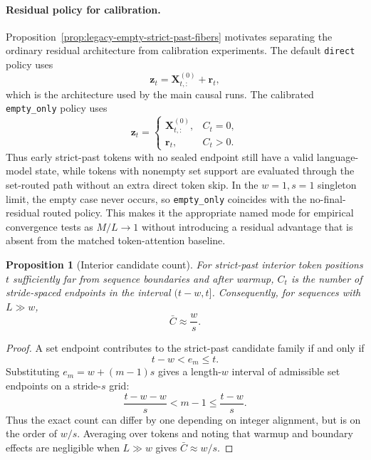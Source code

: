 \documentclass{article}
\theoremstyle{plain}
\newtheorem{proposition}[theorem]{Proposition}
\theoremstyle{definition}
\theoremstyle{remark}
\begin{document}
\paragraph{Residual policy for calibration.}
Proposition~\ref{prop:legacy-empty-strict-past-fibers} motivates separating the
ordinary residual architecture from calibration experiments. The default
\texttt{direct} policy uses
\[
\mathbf z_t=\mathbf X^{(0)}_{t,:}+\mathbf r_t,
\]
which is the architecture used by the main causal runs. The calibrated
\texttt{empty\_only} policy uses
\[
\mathbf z_t=
\begin{cases}
\mathbf X^{(0)}_{t,:},& C_t=0,\\
\mathbf r_t,& C_t>0.
\end{cases}
\]
Thus early strict-past tokens with no sealed endpoint still have a valid
language-model state, while tokens with nonempty set support are evaluated
through the set-routed path without an extra direct token skip. In the
$w=1,s=1$ singleton limit, the empty case never occurs, so
\texttt{empty\_only} coincides with the no-final-residual routed policy.
This makes it the appropriate named mode for empirical convergence tests as
$M/L\to1$ without introducing a residual advantage that is absent from the
matched token-attention baseline.

\begin{proposition}[Interior candidate count]
\label{prop:legacy-interior-candidate-count}
For strict-past interior token positions $t$ sufficiently far from sequence boundaries and after warmup, $C_t$ is the number of stride-spaced endpoints in the interval $(t-w,t]$.
Consequently, for sequences with $L\gg w$,
\begin{equation}
\label{eq:mean-candidate-approx}
\bar C\approx\frac{w}{s}.
\end{equation}
\end{proposition}

\begin{proof}
A set endpoint contributes to the strict-past candidate family if and only if
\[
t-w<e_m\le t.
\]
Substituting $e_m=w+(m-1)s$ gives a length-$w$ interval of admissible set endpoints on a stride-$s$ grid:
\[
\frac{t-w-w}{s}< m-1\le \frac{t-w}{s}.
\]
Thus the exact count can differ by one depending on integer alignment, but is on the order of $w/s$. Averaging over tokens and noting that warmup and boundary effects are negligible when $L\gg w$ gives $\bar C\approx w/s$.
\end{proof}

\end{document}
